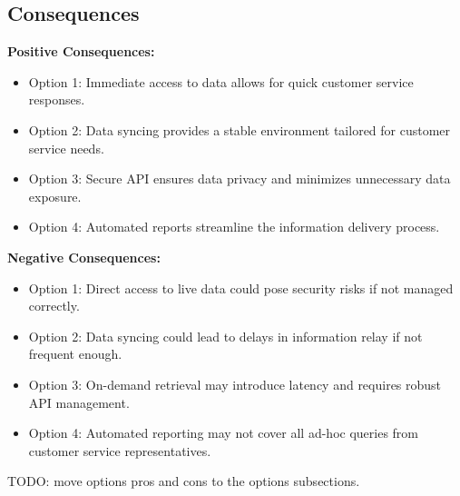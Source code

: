 \subsection*{Consequences}
\textbf{Positive Consequences:}
\begin{itemize}
    \item Option 1: Immediate access to data allows for quick customer service responses.
    \item Option 2: Data syncing provides a stable environment tailored for customer service needs.
    \item Option 3: Secure API ensures data privacy and minimizes unnecessary data exposure.
    \item Option 4: Automated reports streamline the information delivery process.
\end{itemize}
\textbf{Negative Consequences:}
\begin{itemize}
    \item Option 1: Direct access to live data could pose security risks if not managed correctly.
    \item Option 2: Data syncing could lead to delays in information relay if not frequent enough.
    \item Option 3: On-demand retrieval may introduce latency and requires robust API management.
    \item Option 4: Automated reporting may not cover all ad-hoc queries from customer service representatives.
\end{itemize}
TODO: move options pros and cons to the options subsections.